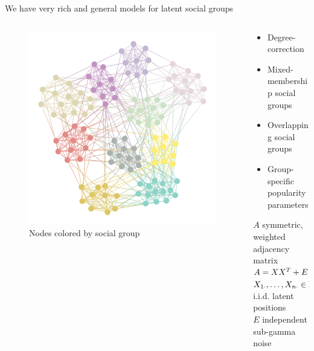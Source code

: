 \documentclass[aspectratio=169]{beamer}
\theoremstyle{remark}
\begin{document}
\begin{frame}{We have very rich and general models for latent social groups}
    \begin{columns}
        \begin{column}{0.4\textwidth}
            \begin{figure}
                \centering
                \includegraphics[width=\textwidth]{./figures/assortative.png}
                \footnotesize
                \caption*{Nodes colored by social group}
            \end{figure}
        \end{column}
        \begin{column}{0.6\textwidth}
            \begin{itemize}
                \item Degree-correction
                \item Mixed-membership social groups
                \item Overlapping social groups
                \item Group-specific popularity parameters
            \end{itemize}
            \vspace{4mm}
            \begin{definition}
                $A$ symmetric, weighted adjacency matrix \\
                $A = X X^T + E$ \\
                $X_{1 \cdot}, \dots, X_{n \cdot} \in \mathbb{R}^{1 \times d}$ i.i.d. latent positions \\
                $E$ independent sub-gamma noise
            \end{definition}
        \end{column}
    \end{columns}
\end{frame}
\end{document}
